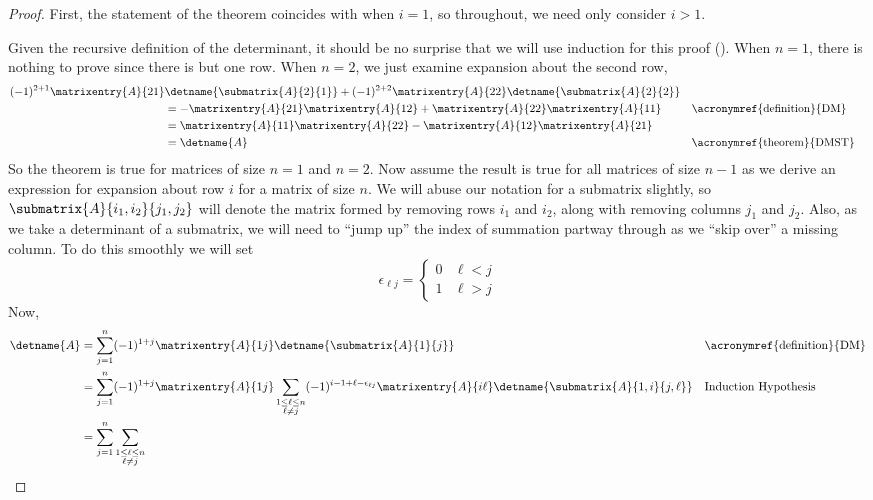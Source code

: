 \begin{proof}
First, the statement of the theorem coincides with  when $i=1$, so throughout, we need only consider $i>1$.\par
%
Given the recursive definition of the determinant, it should be no surprise that we will use induction for this proof ().  When $n=1$, there is nothing to prove since there is but one row.  When $n=2$, we just examine expansion about the second row,
%
\begin{align*}
(-1)^{2+1}\matrixentry{A}{21}&\detname{\submatrix{A}{2}{1}}+
(-1)^{2+2}\matrixentry{A}{22}\detname{\submatrix{A}{2}{2}}\\
&=-\matrixentry{A}{21}\matrixentry{A}{12}+\matrixentry{A}{22}\matrixentry{A}{11}
&&\text{\acronymref{definition}{DM}}\\
%
&=\matrixentry{A}{11}\matrixentry{A}{22}-\matrixentry{A}{12}\matrixentry{A}{21}\\
%
&=
\detname{A}&&\text{\acronymref{theorem}{DMST}}\\
\end{align*}
%
So the theorem is true for matrices of size $n=1$ and $n=2$.  Now assume the result is true for all matrices of size $n-1$ as we derive an expression for expansion about row $i$ for a matrix of size $n$.  We will abuse our notation for a submatrix slightly, so $\submatrix{A}{i_1,i_2}{j_1,j_2}$ will denote the matrix formed by removing rows $i_1$ and $i_2$, along with removing columns $j_1$ and $j_2$.  Also, as we take a determinant of a submatrix, we will need to ``jump up'' the index of summation partway through as we ``skip over'' a missing column.  To do this smoothly we will set
%
\begin{equation*}
\epsilon_{\ell j}=
\begin{cases}
0 & \ell<j\\
1 & \ell>j
\end{cases}
\end{equation*}
%
Now,
%
\begin{align*}
\detname{A}
&=
\sum_{j=1}^{n}(-1)^{1+j}\matrixentry{A}{1j}\detname{\submatrix{A}{1}{j}}
&&\text{\acronymref{definition}{DM}}\\
%
&=
\sum_{j=1}^{n}(-1)^{1+j}\matrixentry{A}{1j}
\sum_{\substack{1\leq\ell\leq n\\\ell\neq j}}
(-1)^{i-1+\ell-\epsilon_{\ell j}}\matrixentry{A}{i\ell}\detname{\submatrix{A}{1,i}{j,\ell}}
&&\text{Induction Hypothesis}\\
%
&=
\sum_{j=1}^{n}\sum_{\substack{1\leq\ell\leq n\\\ell\neq j}}

\end{align*}
\end{proof}
